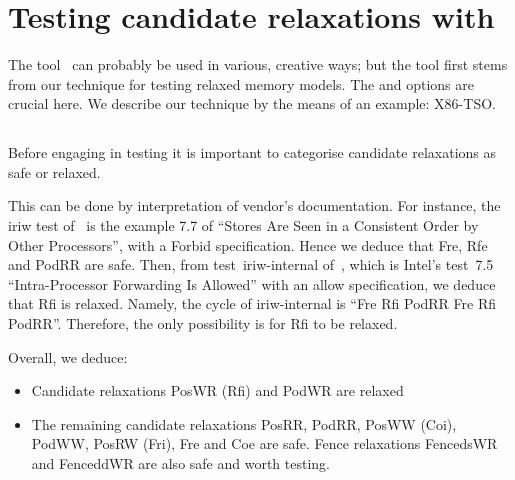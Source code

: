 \section{Testing\label{diy:intro} candidate relaxations with \diy}

The tool~\diy{} can probably be used in various, creative ways;
but the tool first stems from our technique for testing relaxed memory
models.
The  and  options are crucial here.
We describe our technique by the means of an example: X86-TSO.

\subsection{}

Before engaging in testing it is important to categorise
candidate relaxations as safe or relaxed.

This can be done by interpretation of vendor's documentation.
For instance, the iriw test of~\mysec{\ref{iriw}} is the example 7.7 of
\cite{intel:white}
``Stores Are Seen in a Consistent Order by Other Processors'',
with a Forbid specification.
Hence we deduce that Fre, Rfe and PodRR are safe.
Then, from test~iriw-internal of~\mysec{\ref{iriw}},
which is Intel's test~7.5 ``Intra-Processor Forwarding Is Allowed''
with an allow specification,
we deduce that Rfi is relaxed.
Namely, the cycle of iriw-internal is
``Fre Rfi PodRR Fre Rfi PodRR''. Therefore, the only possibility is for
Rfi to be relaxed.

Overall, we deduce:
\begin{itemize}
\item Candidate relaxations PosWR (Rfi) and PodWR are relaxed
\item The remaining candidate relaxations PosRR, PodRR, PosWW (Coi),  PodWW,
PosRW (Fri), Fre and Coe are safe.
Fence relaxations FencedsWR and FenceddWR are also safe
and worth testing.
\end{itemize}

